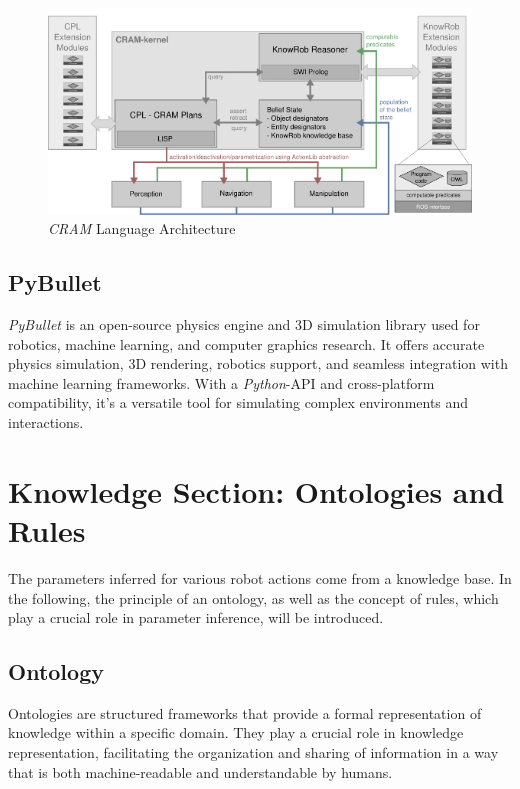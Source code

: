     \begin{figure}[H]
    \includegraphics[scale=1.5]{Graphics/cram-language-architecture.png}
	\caption{\textit{CRAM} \cite{beetz10cram} Language Architecture}
    \end{figure}

	\subsection{PyBullet}
	\label{sec:pybullet}
	\textit{PyBullet}\cite{coumans2021} is an open-source physics engine and 3D simulation library used for robotics, machine learning, and computer graphics research. 
	It offers accurate physics simulation, 3D rendering, robotics support, and seamless integration with machine learning frameworks. 
	With a \textit{Python}-API and cross-platform compatibility, it's a versatile tool for simulating complex environments and interactions.
    
	\section{Knowledge Section: Ontologies and Rules}
    The parameters inferred for various robot actions come from a knowledge base. In the following, the principle of an ontology, as well as the concept of rules, which play a crucial role in parameter inference, will be introduced.
    \subsection{Ontology}
	Ontologies \cite{ontotext} are structured frameworks that provide a formal representation of knowledge within a specific domain. They play a crucial role in knowledge representation, facilitating the organization and sharing of information in a way that is both machine-readable and understandable by humans. 


